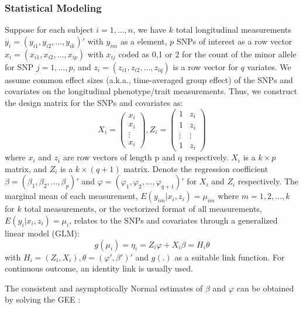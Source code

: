 \documentclass[12pt]{article}
\begin{document}
\subsubsection{Statistical Modeling}\label{sec:subsub1-1}
Suppose for each subject $i = 1,\ldots,n$, we have $k$ total longitudinal measurements $y_i = (y_{i1}, y_{i2}, \ldots, y_{ik})'$ with $y_{im}$ as a element, $p$ SNPs of interest as a row vector $x_i = (x_{i1}, x_{i2}, \ldots, x_{ip})$ with $x_{ij}$ coded as 0,1 or 2 for the count of the minor allele for SNP $j = 1, \ldots, p$, and $z_i = (z_{i1}, z_{i2}, \ldots, z_{iq})$ is a row vector for $q$ variates. We assume common effect sizes (a.k.a., time-averaged group effect) of the SNPs and covariates on the longitudinal phenotype/trait measurements. Thus, we construct the design matrix for the SNPs and covariates as:
$$
  X_i = \begin{pmatrix}
          x_{i}\\
          x_{i}\\
          \vdots\\
          x_{i}
          \end{pmatrix} 
  , 
  Z_{i}=\begin{pmatrix}1 & z_{i}\\
          1 & z_{i}\\
          \vdots & \vdots\\
          1 & z_{i}
          \end{pmatrix}
$$
where $x_i$ and $z_i$ are row vectors of length p and q respectively. $X_i$ is a $k \times p$ matrix, and $Z_{i}$ is a $k \times (q+1)$ matrix. Denote the regression coefficient $\beta = (\beta_1, \beta_2, \ldots, \beta_p)'$ and $\varphi = (\varphi_1, \varphi_2, \ldots, \varphi_{q+1})'$ for $X_i$ and $Z_i$ respectively. The marginal mean of each measurement, $E(y_{im}|x_i,z_i) = \mu_{im}$ where $m = 1,2, \ldots, k$ for $k$ total measurements, or the vectorized format of all measurements, $E(y_{i}|x_i,z_i) = \mu_{i}$, relates to the SNPs and covariates through a generalized linear model (GLM):
$$
g(\mu_i) = \eta_i = Z_i \varphi + X_i \beta = H_i \theta
$$
\noindent with $H_i = (Z_i, X_i), \theta = (\varphi', \beta')'$ and $g(.)$ as a suitable link function. For continuous outcome, an identity link is usually used.

The consistent and asymptotically Normal estimates of $\beta$ and $\varphi$ can be obtained by solving the GEE \cite{liang1986longitudinal}: 
\end{document}
